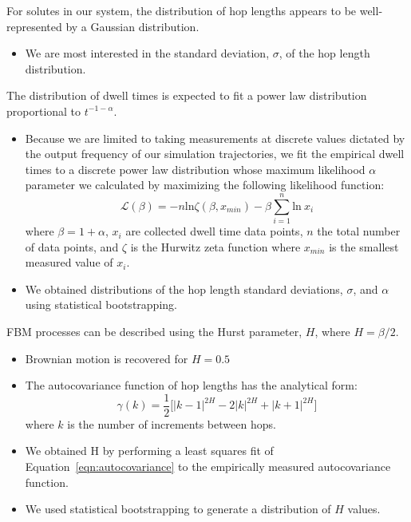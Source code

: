 \documentclass{article}
\begin{document}
  For solutes in our system, the distribution of hop lengths appears to be
  well-represented by a Gaussian distribution.~\cite{metzler_random_2000,
  metzler_anomalous_2014,neusius_subdiffusion_2009}  %
  \begin{itemize}
	\item We are most interested in the standard deviation, $\sigma$, of the 
	hop length distribution.
  \end{itemize}
  
  \noindent The distribution of dwell times is expected to fit a power law
  distribution proportional to $t^{-1-\alpha}$.~\cite{meroz_toolbox_2015}
  \begin{itemize}
	\item Because we are limited to taking measurements at discrete values
	dictated by the output frequency of our simulation trajectories, we fit the
	empirical dwell times to a discrete power law distribution whose maximum
	likelihood $\alpha$ parameter we calculated by maximizing the following
	likelihood function: 
        \begin{equation}
	\mathcal{L}(\beta) = -n\text{ln}\zeta(\beta, x_{min}) -
	\beta\sum_{i=1}^{n} \text{ln}~x_i 
	\label{eqn:powerlaw_likelihood}
	\end{equation}
	where $\beta = 1 + \alpha$, $x_i$ are collected dwell time data points,
	$n$ the total number of data points, and $\zeta$ is the Hurwitz zeta function
	where $x_{min}$ is the smallest measured value of
	$x_i$.~\cite{clauset_power-law_2009} 
	\item We obtained distributions of the hop length standard deviations, $\sigma$, and
	$\alpha$ using statistical bootstrapping.\cite{efron_introduction_1994} 
  \end{itemize}
  
  \noindent FBM processes can be described using the Hurst parameter, $H$, where 
  $H = \beta/2$.
  \begin{itemize}
  	\item Brownian motion is recovered for $H = 0.5$
	\item The autocovariance function of hop lengths has the analytical form:~\cite{mandelbrot_fractional_1968}
    \begin{equation}
	\gamma(k) = \dfrac{1}{2}\bigg[|k-1|^{2H} - 2|k|^{2H} + |k+1|^{2H}\bigg]
	\label{eqn:autocovariance}
	\end{equation}
	where $k$ is the number of increments between hops.
	\item We obtained H by performing a least squares fit of Equation~\ref{eqn:autocovariance}
	to the empirically measured autocovariance function.
	\item We used statistical bootstrapping to generate a distribution of $H$ 
	values. %
  \end{itemize}
  
\end{document}
